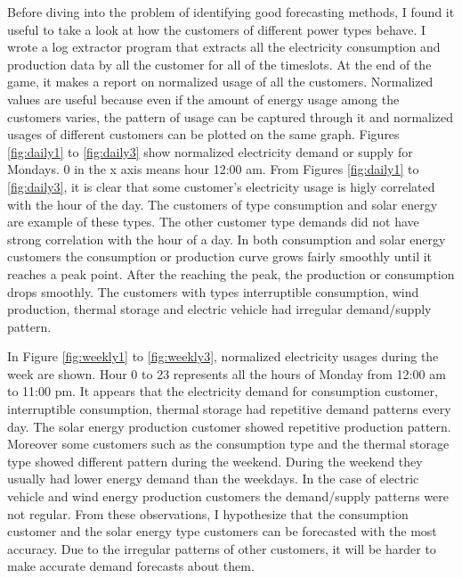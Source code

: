 Before diving into the problem of identifying good forecasting methods, I found it useful to take a look at how the customers of different power types behave. I wrote a log extractor program that extracts all the electricity consumption and production data by all the customer for all of the timeslots. At the end of the game, it makes a report on normalized usage of all the customers. Normalized values are useful because even if the amount of energy usage among the customers varies, the pattern of usage can be captured through it and normalized usages of different customers can be plotted on the same graph. Figures \ref{fig:daily1} to \ref{fig:daily3} show normalized electricity demand or supply for Mondays. 0 in the x axis means hour 12:00 am. From Figures \ref{fig:daily1} to \ref{fig:daily3}, it is clear that some customer's electricity usage is higly correlated with the hour of the day. The customers of type consumption and solar energy are example of these types. The other customer type demands did not have strong correlation with the hour of a day. In both consumption and solar energy customers the consumption or production curve grows fairly smoothly until it reaches a peak point. After the reaching the peak, the production or consumption drops smoothly. The customers with types interruptible consumption, wind production, thermal storage and electric vehicle had irregular demand/supply pattern. 

In Figure \ref{fig:weekly1} to \ref{fig:weekly3}, normalized electricity usages during the week are shown. Hour 0 to 23 represents all the hours of Monday from 12:00 am to 11:00 pm. It appears that the electricity demand for consumption customer, interruptible consumption, thermal storage had repetitive demand patterns every day. The  solar energy production customer showed repetitive production pattern. Moreover some customers such as the consumption type and the thermal storage type showed different pattern during the weekend. During the weekend they usually had lower energy demand than the weekdays. In the case of electric vehicle and wind energy production customers the demand/supply patterns were not regular. From these observations, I hypothesize that the consumption customer and the solar energy type customers can be forecasted with the most accuracy. Due to the irregular patterns of other customers, it will be harder to make accurate demand forecasts about them.
 
